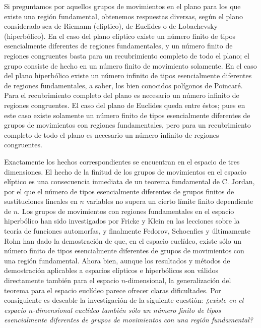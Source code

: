 \documentclass[a4paper, 12pt]{article}
\begin{document}
Si preguntamos por aquellos grupos de movimientos en el plano para los que existe una región fundamental, obtenemos respuestas diversas, según el plano considerado sea de Riemann (elíptico), de Euclides o de Lobachevsky (hiperbólico). En el caso del plano elíptico existe un número finito de tipos esencialmente diferentes de regiones fundamentales, y un número finito de regiones congruentes basta para un recubrimiento completo de todo el plano; el grupo consiste de hecho en un número finito de movimiento solamente. En el caso del plano hiperbólico existe un número infinito de tipos esencialmente diferentes de regiones fundamentales, a saber, los bien conocidos polígonos de Poincaré. Para el recubrimiento completo del plano es necesario un número infinito de regiones congruentes. El caso del plano de Euclides queda entre éstos; pues en este caso existe solamente un número finito de tipos esencialmente diferentes de grupos de movimientos con regiones fundamentales, pero para un recubrimiento completo de todo el plano es necesario un número infinito de regiones congruentes.

Exactamente los hechos correspondientes se encuentran en el espacio de tres dimensiones. El hecho de la finitud de los grupos de movimientos en el espacio elíptico es una consecuencia inmediata de un teorema fundamental de C. Jordan, por el que el número de tipos esencialmente diferentes de grupos finitos de sustituciones lineales en $n$ variables no supera un cierto límite finito dependiente de $n$. Los grupos de movimientos con regiones fundamentales en el espacio hiperbólico han sido investigados por Fricke y Klein en las lecciones sobre la teoría de funciones automorfas, y finalmente Fedorov, Schoenfies y últimamente Rohn han dado la demostración de que, en el espacio euclídeo, existe sólo un número finito de tipos esencialmente diferentes de grupos de movimientos con una región fundamental. Ahora bien, aunque los resultados y métodos de demostración aplicables a espacios elípticos e hiperbólicos son válidos directamente también para el espacio $n$-dimensional, la generalización del teorema para el espacio euclídeo parece ofrecer claras dificultades. Por consiguiente es deseable la investigación de la siguiente cuestión: \textit{¿existe en el espacio $n$-dimensional euclídeo también sólo un número finito de tipos esencialmente diferentes de grupos de movimientos con una región fundamental?}
\end{document}
